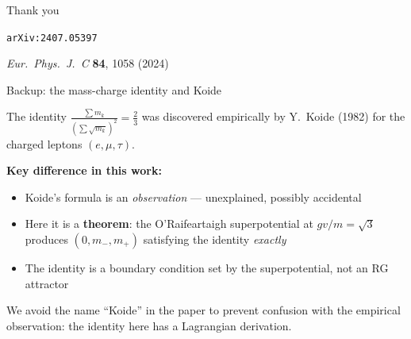\documentclass[aspectratio=169,12pt]{beamer}
\begin{document}
\begin{frame}{}
\centering
\Huge Thank you

\bigskip
\large
\texttt{arXiv:2407.05397}

\bigskip
\normalsize
\textit{Eur.\ Phys.\ J.\ C} \textbf{84}, 1058 (2024)
\end{frame}


\appendix
{}
\setcounter{finalframe}{\value{framenumber}}

\begin{frame}{Backup: the mass-charge identity and Koide}

The identity
$\displaystyle\frac{\sum m_k}{(\sum\sqrt{m_k})^2} = \frac{2}{3}$
was discovered empirically by Y.~Koide (1982) for the
charged leptons $(e,\mu,\tau)$.

\bigskip
\textbf{Key difference in this work:}
\begin{itemize}
\item Koide's formula is an \emph{observation} --- unexplained,
possibly accidental
\item Here it is a \textbf{theorem}: the O'Raifeartaigh
superpotential at $gv/m = \sqrt{3}$ produces
$(0, m_-, m_+)$ satisfying the identity \emph{exactly}
\item The identity is a boundary condition set by the
superpotential, not an RG attractor
\end{itemize}

\bigskip
We avoid the name ``Koide'' in the paper to prevent confusion
with the empirical observation: the identity here has a
Lagrangian derivation.

\end{frame}
\end{document}
